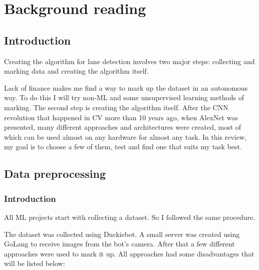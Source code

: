 \section{Background reading}
\subsection{Introduction}
Creating the algorithm for lane detection involves two major steps: collecting and marking
data and creating the algorithm itself. 

Lack of finance makes me find a way to mark up the dataset in an autonomous way. To do this
I will try non-ML and some unsupervised learning methods of marking.
The second step is creating the algorithm itself. After the CNN revolution that 
happened in CV more than 10 years ago, when AlexNet was presented\cite{alexnet}, many different approaches and
architectures were created, most of which can be used almost on any hardware for almost any task. 
In this review, my goal is to choose a few of them, test and find one that suits my task best.

\subsection{Data preprocessing}
\subsubsection{Introduction}
All ML projects start with collecting a dataset. So I followed the same procedure. 

The dataset was collected using Duckiebot. A small server was created 
using GoLang to receive images from the bot's camera. After that a few 
different approaches were used to mark it up. All approaches had some disadvantages that will
be listed below:

